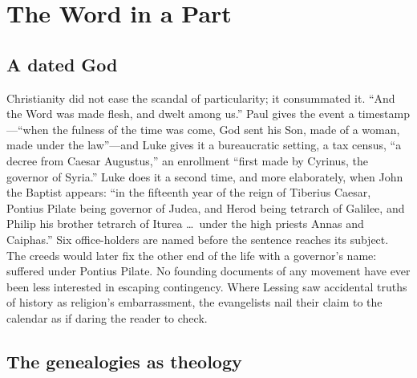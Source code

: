 \section{The Word in a Part}

\subsection{A dated God}

Christianity did not ease the scandal of particularity; it consummated it. ``And the Word was made flesh, and dwelt among us.'' Paul gives the event a timestamp---``when the fulness of the time was come, God sent his Son, made of a woman, made under the law''---and Luke gives it a bureaucratic setting, a tax census, ``a decree from Caesar Augustus,'' an enrollment ``first made by Cyrinus, the governor of Syria.'' Luke does it a second time, and more elaborately, when John the Baptist appears: ``in the fifteenth year of the reign of Tiberius Caesar, Pontius Pilate being governor of Judea, and Herod being tetrarch of Galilee, and Philip his brother tetrarch of Iturea \ldots\ under the high priests Annas and Caiphas.'' Six office-holders are named before the sentence reaches its subject. The creeds would later fix the other end of the life with a governor's name: suffered under Pontius Pilate. No founding documents of any movement have ever been less interested in escaping contingency. Where Lessing saw accidental truths of history as religion's embarrassment, the evangelists nail their claim to the calendar as if daring the reader to check.

\subsection{The genealogies as theology}

